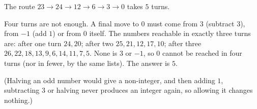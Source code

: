 The route $23\to24\to12\to6\to3\to0$ takes $5$ turns.

Four turns are not enough. A final move to $0$ must come from $3$ (subtract $3$), from $-1$ (add $1$) or from $0$ itself. The numbers reachable in exactly three turns are: after one turn $24,20$; after two $25,21,12,17,10$; after three $26,22,18,13,9,6,14,11,7,5$. None is $3$ or $-1$, so $0$ cannot be reached in four turns (nor in fewer, by the same lists). The answer is $\boxed{5}$.

(Halving an odd number would give a non-integer, and then adding $1$, subtracting $3$ or halving never produces an integer again, so allowing it changes nothing.)
